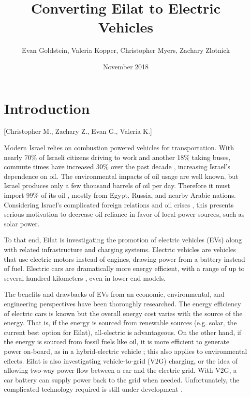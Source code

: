 \documentclass[12pt]{article}                         %
\title{Converting Eilat to Electric Vehicles}
\author{Evan Goldstein, Valeria Kopper, Christopher Myers, Zachary Zlotnick}
\date{November 2018}
\begin{document}
\maketitle
\newpage

\renewcommand\abstractname{Summary} %

\tableofcontents
\newpage
\listofauthorships
\newpage
{}
\doublespacing

\section{Introduction}[Christopher M., Zachary Z., Evan G., Valeria K.]

Modern Israel relies on combustion powered vehicles for transportation. With nearly 70\% of Israeli citizens driving to work and another 18\% taking buses, commute times have increased 30\% over the past decade \cite{Dori2018IsraeliRoads}, increasing Israel's dependence on oil. The environmental impacts of oil usage are well known, but Israel produces only a few thousand barrels of oil per day. Therefore it must import 99\% of its oil \cite{Engber2006WhereOil}, mostly from Egypt, Russia, and nearby Arabic nations. Considering Israel's complicated foreign relations and oil crises \cite{Engber2006WhereOil}, this presents serious motivation to decrease oil reliance in favor of local power sources, such as solar power.

To that end, Eilat is investigating the promotion of electric vehicles (EVs) along with related infrastructure and charging systems. Electric vehicles are vehicles that use electric motors instead of engines, drawing power from a battery instead of fuel. Electric cars are dramatically more energy efficient, with a range of up to several hundred kilometers \cite{Friel2010ManagementVehicles}, even in lower end models.

The benefits and drawbacks of EVs from an economic, environmental, and engineering perspectives have been thoroughly researched. The energy efficiency of electric cars is known but the overall energy cost varies with the source of the energy. That is, if the energy is sourced from renewable sources (e.g. solar, the current best option for Eilat), all-electric is advantageous. On the other hand, if the energy is sourced from fossil fuels like oil, it is more efficient to generate power on-board, as in a hybrid-electric vehicle \cite{Dincer2010EconomicOptions}; this also applies to environmental effects. Eilat is also investigating vehicle-to-grid (V2G) charging, or the idea of allowing two-way power flow between a car and the electric grid. With V2G, a car battery can supply power back to the grid when needed. Unfortunately, the complicated technology required is still under development \cite{2018Nuvve...}.
\end{document}
